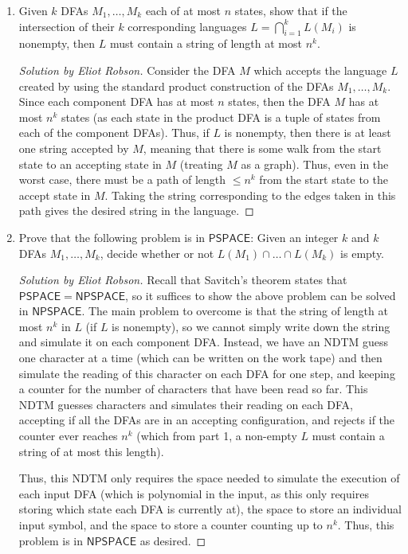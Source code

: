 \documentclass{article}
\newenvironment{solution}[1]{\begin{proof}[Solution by #1]}{\end{proof}}
\newcommand{\PSPACE}{\mathsf{PSPACE}}
\newcommand{\NPSPACE}{\mathsf{NPSPACE}}
\begin{document}
\begin{enumerate}
	\item Given \(k\) DFAs \(M_1, \dots, M_k\) each of at most \(n\) states, show that if the intersection of their \(k\) corresponding languages \(L = \bigcap_{i=1}^{k} L(M_i)\) is nonempty, then \(L\) must contain a string of length at most \(n^{k}\).
	
	\begin{solution}{Eliot Robson}
		Consider the DFA \(M\) which accepts the language \(L\) created by using the standard product construction of the DFAs \(M_1, \dots, M_k\). Since each component DFA has at most \(n\) states, then the DFA \(M\) has at most \(n^k\) states (as each state in the product DFA is a tuple of states from each of the component DFAs). Thus, if \(L\) is nonempty, then there is at least one string accepted by \(M\), meaning that there is some walk from the start state to an accepting state in \(M\) (treating \(M\) as a graph). Thus, even in the worst case, there must be a path of length \(\leq n^k\) from the start state to the accept state in \(M\). Taking the string corresponding to the edges taken in this path gives the desired string in the language.
	\end{solution}
	
	\item Prove that the following problem is in \(\PSPACE\): Given an integer \(k\) and \(k\) DFAs \(M_1, \dots, M_k\), decide whether or not \(L(M_1) \cap \dots \cap L(M_k)\) is empty.
    
    \begin{solution}{Eliot Robson}
        Recall that Savitch's theorem states that \(\PSPACE = \NPSPACE\), so it suffices to show the above problem can be solved in \(\NPSPACE\). The main problem to overcome is that the string of length at most \(n^k\) in \(L\) (if \(L\) is nonempty), so we cannot simply write down the string and simulate it on each component DFA. Instead, we have an NDTM guess one character at a time (which can be written on the work tape) and then simulate the reading of this character on each DFA for one step, and keeping a counter for the number of characters that have been read so far. This NDTM guesses characters and simulates their reading on each DFA, accepting if all the DFAs are in an accepting configuration, and rejects if the counter ever reaches \(n^k\) (which from part 1, a non-empty \(L\) must contain a string of at most this length).
        
        Thus, this NDTM only requires the space needed to simulate the execution of each input DFA (which is polynomial in the input, as this only requires storing which state each DFA is currently at), the space to store an individual input symbol, and the space to store a counter counting up to \(n^k\). Thus, this problem is in \(\NPSPACE\) as desired.
    \end{solution}
\end{enumerate}
\end{document}
